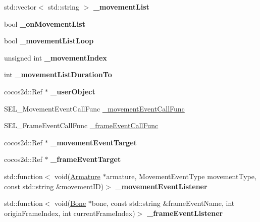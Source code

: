\begin{DoxyCompactItemize}
std\+::vector$<$ std\+::string $>$ {\bfseries \+\_\+movement\+List}
\item 
\mbox{\label{classcocostudio_1_1ArmatureAnimation_aba3319e399123ef22ad1ac96041e7531}} 
bool {\bfseries \+\_\+on\+Movement\+List}
\item 
\mbox{\label{classcocostudio_1_1ArmatureAnimation_a9bdb01aca8bc05d00596666c09edc35a}} 
bool {\bfseries \+\_\+movement\+List\+Loop}
\item 
\mbox{\label{classcocostudio_1_1ArmatureAnimation_a04913b6dd9c8cec85cd421dd7bee9028}} 
unsigned int {\bfseries \+\_\+movement\+Index}
\item 
\mbox{\label{classcocostudio_1_1ArmatureAnimation_aca1f4038a20e0903cb53fb1aca1e7f6a}} 
int {\bfseries \+\_\+movement\+List\+Duration\+To}
\item 
\mbox{\label{classcocostudio_1_1ArmatureAnimation_a9b11e08b4add83e5110cc36e5ac8ac35}} 
cocos2d\+::\+Ref $\ast$ {\bfseries \+\_\+user\+Object}
\item 
S\+E\+L\+\_\+\+Movement\+Event\+Call\+Func \hyperlink{classcocostudio_1_1ArmatureAnimation_ab88699d4b2081f3dd350503eef5dad34}{\+\_\+movement\+Event\+Call\+Func}
\item 
S\+E\+L\+\_\+\+Frame\+Event\+Call\+Func \hyperlink{classcocostudio_1_1ArmatureAnimation_a34b902f6ebdb1f2c9cdd722ef5a42ead}{\+\_\+frame\+Event\+Call\+Func}
\item 
\mbox{\label{classcocostudio_1_1ArmatureAnimation_a1cfbe62b27f02f57907063cf1cb15763}} 
cocos2d\+::\+Ref $\ast$ {\bfseries \+\_\+movement\+Event\+Target}
\item 
\mbox{\label{classcocostudio_1_1ArmatureAnimation_ad145c4c2c1c00020c621371a7f750a0b}} 
cocos2d\+::\+Ref $\ast$ {\bfseries \+\_\+frame\+Event\+Target}
\item 
\mbox{\label{classcocostudio_1_1ArmatureAnimation_a7d69367c6f8b500162f9ad542efb39d2}} 
std\+::function$<$ void(\hyperlink{classcocostudio_1_1Armature}{Armature} $\ast$armature, Movement\+Event\+Type movement\+Type, const std\+::string \&movement\+ID)$>$ {\bfseries \+\_\+movement\+Event\+Listener}
\item 
\mbox{\label{classcocostudio_1_1ArmatureAnimation_a451d9576d503acb1976d56b3c6db07f7}} 
std\+::function$<$ void(\hyperlink{classcocostudio_1_1Bone}{Bone} $\ast$bone, const std\+::string \&frame\+Event\+Name, int origin\+Frame\+Index, int current\+Frame\+Index)$>$ {\bfseries \+\_\+frame\+Event\+Listener}
\end{DoxyCompactItemize}
